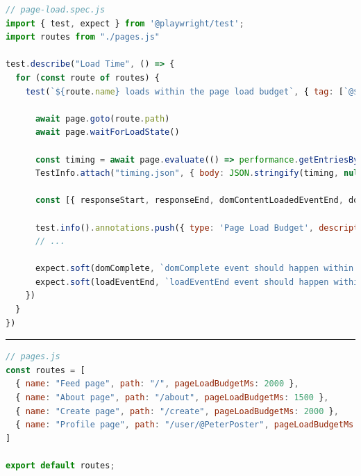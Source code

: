 \documentclass[a4paper, 12pt]{article}
\begin{document}
\vspace{1cm}
\begin{lstlisting}[caption={Test file for page load times}, label={lst:page-load-spec}, language=JavaScript]
// page-load.spec.js
import { test, expect } from '@playwright/test';
import routes from "./pages.js"

test.describe("Load Time", () => {
  for (const route of routes) {
    test(`${route.name} loads within the page load budget`, { tag: [`@${route.name}`, '@pageLoad'] }, async ({ page }, TestInfo) => {

      await page.goto(route.path)
      await page.waitForLoadState()

      const timing = await page.evaluate(() => performance.getEntriesByType('navigation'));
      TestInfo.attach("timing.json", { body: JSON.stringify(timing, null, 2), contentType: "application/json" })

      const [{ responseStart, responseEnd, domContentLoadedEventEnd, domComplete, loadEventEnd }] = timing;

      test.info().annotations.push({ type: 'Page Load Budget', description: `The time budget for this page was ${route.pageLoadBudgetMs}ms` });
      // ...

      expect.soft(domComplete, `domComplete event should happen within ${route.pageLoadBudgetMs} ms`).toBeLessThanOrEqual(route.pageLoadBudgetMs)
      expect.soft(loadEventEnd, `loadEventEnd event should happen within ${route.pageLoadBudgetMs} ms`).toBeLessThanOrEqual(route.pageLoadBudgetMs)
    })
  }
})
\end{lstlisting}
\hrule
\begin{lstlisting}[caption={Test pages configuration}, label={lst:pages-config}, language=JavaScript]
// pages.js
const routes = [
  { name: "Feed page", path: "/", pageLoadBudgetMs: 2000 },
  { name: "About page", path: "/about", pageLoadBudgetMs: 1500 },
  { name: "Create page", path: "/create", pageLoadBudgetMs: 2000 },
  { name: "Profile page", path: "/user/@PeterPoster", pageLoadBudgetMs: 2000 },
]

export default routes;
\end{lstlisting}
\vspace{1cm}
\end{document}
